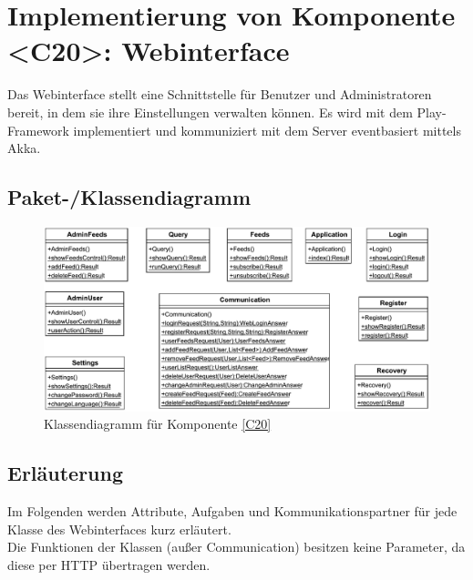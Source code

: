 
\section{Implementierung von Komponente <C20>: Webinterface}

Das Webinterface stellt eine Schnittstelle für Benutzer und Administratoren bereit, in dem sie ihre Einstellungen verwalten können. Es wird mit dem Play-Framework implementiert und kommuniziert mit dem Server eventbasiert mittels Akka.

\subsection{Paket-/Klassendiagramm}

\begin{figure}[ht]
\centering
\includegraphics[width=1.03\textwidth]{Systementwurf/05_implementierungsentwurf/webinterface}
\caption{Klassendiagramm für Komponente \ref{C20}}
\end{figure}

\subsection{Erläuterung}

Im Folgenden werden Attribute, Aufgaben und Kommunikationspartner für jede Klasse des Webinterfaces kurz erläutert.\\
Die Funktionen der Klassen (außer Communication) besitzen keine Parameter, da diese per HTTP übertragen werden.

